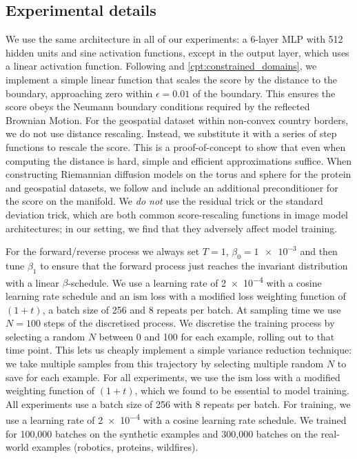 \subsection{Experimental details}
\label{sec:app_implementational_details}

We use the same architecture in all of our experiments: a 6-layer MLP with 512 hidden units and sine activation functions, except in the output layer, which uses a linear activation function.
Following \textcite{liu2022estimating} and \cref{cpt:constrained_domains}, we implement a simple linear function that scales the score by the distance to the boundary, approaching zero within $\epsilon = 0.01$ of the boundary.
This ensures the score obeys the Neumann boundary conditions required by the reflected Brownian Motion.
For the geospatial dataset within non-convex country borders, we do not use distance rescaling.
Instead, we substitute it with a series of step functions to rescale the score.
This is a proof-of-concept to show that even when computing the distance is hard, simple and efficient approximations suffice.
When constructing Riemannian diffusion models on the torus and sphere for the protein and geospatial datasets, we follow \cite{de2022riemannian} and include an additional preconditioner for the score on the manifold.
We \emph{do not} use the residual trick or the standard deviation trick, which are both common score-rescaling functions in image model architectures; in our setting, we find that they adversely affect model training.

For the forward/reverse process we always set $T=1$, $\beta_0=\num{1e-3}$ and then tune $\beta_1$ to ensure that the forward process just reaches the invariant distribution with a linear $\beta$-schedule.
We use a learning rate of \num{2e-4} with a cosine learning rate schedule and an \(\mathrm{ism}\) loss with a modified loss weighting function of \((1 + t)\), a batch size of 256 and 8 repeats per batch.
At sampling time we use $N=100$ steps of the discretised process.
We discretise the training process by selecting a random $N$ between 0 and 100 for each example, rolling out to that time point.
This lets us cheaply implement a simple variance reduction technique: we take multiple samples from this trajectory by selecting multiple random $N$ to save for each example.
For all experiments, we use the $\mathrm{ism}$ loss with a modified weighting function of $(1 + t)$, which we found to be essential to model training.
All experiments use a batch size of 256 with 8 repeats per batch.
For training, we use a learning rate of \num{2e-4} with a cosine learning rate schedule.
We trained for 100,000 batches on the synthetic examples and 300,000 batches on the real-world examples (robotics, proteins, wildfires).

